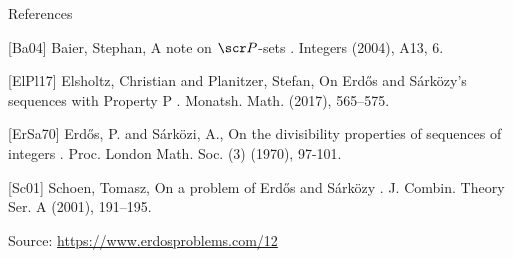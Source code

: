 \documentclass{article}
\begin{document}
References

[Ba04] Baier, Stephan, A note on {$\scr P$}-sets . Integers (2004), A13, 6.

[ElPl17] Elsholtz, Christian and Planitzer, Stefan, On Erd\H{o}s and S\'{a}rk\"ozy's sequences with Property P . Monatsh. Math. (2017), 565--575.

[ErSa70] Erd\H{o}s, P. and S\'{a}rk\"ozi, A., On the divisibility properties of sequences of integers . Proc. London Math. Soc. (3) (1970), 97-101.

[Sc01] Schoen, Tomasz, On a problem of Erd\H{o}s and S\'{a}rk\"ozy . J. Combin. Theory Ser. A (2001), 191--195.


\bigskip
\noindent\small{Source: \url{https://www.erdosproblems.com/12}}
\end{document}
